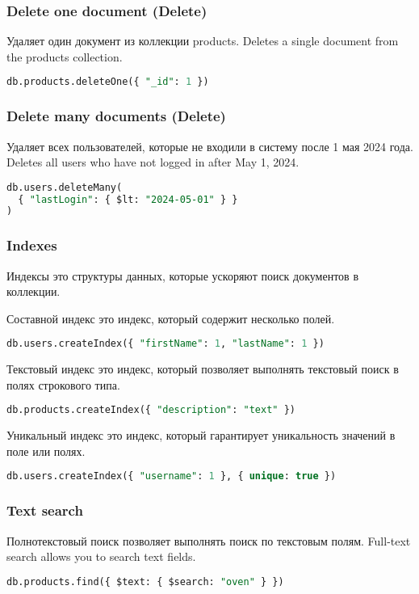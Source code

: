 \documentclass[a4paper,12pt]{article}
\begin{document}
\subsubsection{Delete one document (Delete)}
Удаляет один документ из коллекции products.
\newline
Deletes a single document from the products collection.

\begin{lstlisting}[language=SQL]
db.products.deleteOne({ "_id": 1 })
\end{lstlisting}

\subsubsection{Delete many documents (Delete)}
Удаляет всех пользователей, которые не входили в систему после 1 мая 2024 года.
\newline
Deletes all users who have not logged in after May 1, 2024.

\begin{lstlisting}[language=SQL]
db.users.deleteMany(
  { "lastLogin": { $lt: "2024-05-01" } }
)
\end{lstlisting}

\subsubsection{Indexes}
Индексы это структуры данных, которые ускоряют поиск документов в коллекции.

Составной индекс это индекс, который содержит несколько полей.

\begin{lstlisting}[language=SQL]
db.users.createIndex({ "firstName": 1, "lastName": 1 })
\end{lstlisting}

Текстовый индекс это индекс, который позволяет выполнять текстовый поиск в полях строкового типа.

\begin{lstlisting}[language=SQL]
db.products.createIndex({ "description": "text" })
\end{lstlisting}

Уникальный индекс это индекс, который гарантирует уникальность значений в поле или полях.
\begin{lstlisting}[language=SQL]
db.users.createIndex({ "username": 1 }, { unique: true })
\end{lstlisting}


\subsubsection{Text search}
Полнотекстовый поиск позволяет выполнять поиск по текстовым полям.
\newline
Full-text search allows you to search text fields.
\begin{lstlisting}[language=SQL]
db.products.find({ $text: { $search: "oven" } })
\end{lstlisting}
\end{document}
